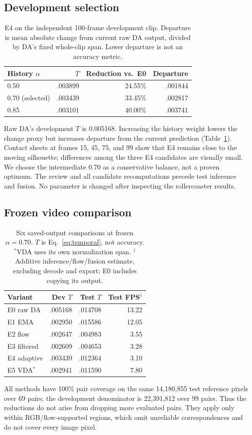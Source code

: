 \subsection{Development selection}
\begin{table}[t]
\centering\small
\begin{tabular}{lrrr}
\toprule
History $\alpha$ & $T$ & Reduction vs.\ E0 & Departure\\\midrule
0.50 & .003899 & 24.55\% & .001844\\
0.70 (selected) & .003439 & 33.45\% & .002817\\
0.85 & .003101 & 40.00\% & .003741\\\bottomrule
\end{tabular}
\caption{E4 on the independent 100-frame development clip. Departure is mean absolute change from current raw DA output, divided by DA's fixed whole-clip span. Lower departure is not an accuracy metric.}
\label{tab:selection}
\end{table}
Raw DA's development $T$ is 0.005168. Increasing the history weight lowers the change proxy but increases departure from the current prediction (Table~\ref{tab:selection}). Contact sheets at frames 15, 45, 75, and 99 show that E4 remains close to the moving silhouette; differences among the three E4 candidates are visually small. We choose the intermediate 0.70 as a conservative balance, not a proven optimum. The review and all candidate recomputations precede test inference and fusion. No parameter is changed after inspecting the rollercoaster results.

\subsection{Frozen video comparison}
\begin{table}[t]
\centering\small
\begin{tabular}{lrrr}
\toprule
Variant & Dev $T$ & Test $T$ & Test FPS$^\dagger$\\\midrule
E0 raw DA & .005168 & .014708 & 13.22\\
E1 EMA & .002950 & .015586 & 12.05\\
E2 flow & .002647 & .004983 & 3.55\\
E3 filtered & .002609 & .004653 & 3.28\\
E4 adaptive & .003439 & .012364 & 3.10\\
E5 VDA$^*$ & .002941 & .011590 & 7.80\\\bottomrule
\end{tabular}
\caption{Six saved-output comparisons at frozen $\alpha=0.70$. $T$ is Eq.~\ref{eq:temporal}, not accuracy. $^*$VDA uses its own normalization span. $^\dagger$Additive inference/flow/fusion estimate, excluding decode and export; E0 includes copying its output.}
\label{tab:video}
\end{table}
All methods have 100\% pair coverage on the same 14,180,855 test reference pixels over 69 pairs; the development denominator is 22,391,812 over 99 pairs. Thus the reductions do not arise from dropping more evaluated pairs. They apply only within RGB/flow-supported regions, which omit unreliable correspondences and do not cover every image pixel.

